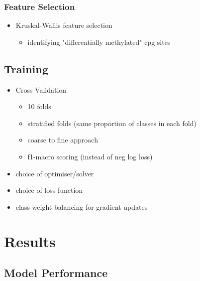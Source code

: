 \documentclass{article}
\begin{document}

\subsubsection{Feature Selection} \label{sec:feature-selection}
\begin{itemize}
    \item Kruskal-Wallis feature selection \cite{Kruskal1952UseOR}
          \begin{itemize}
              \item identifying "differentially methylated" cpg sites 
          \end{itemize}
\end{itemize}

\subsection{Training} \label{sec:training}
\begin{itemize}
    \item Cross Validation
          \begin{itemize}
              \item 10 folds
              \item stratified folds (same proportion of classes in each fold)
              \item coarse to fine approach
              \item f1-macro scoring (instead of neg log loss)
          \end{itemize}
    \item choice of optimiser/solver
    \item choice of loss function
    \item class weight balancing for gradient updates

\end{itemize}

\section{Results} \label{sec:results}

\subsection{Model Performance} \label{sec:cohort1-performance}
\end{document}
